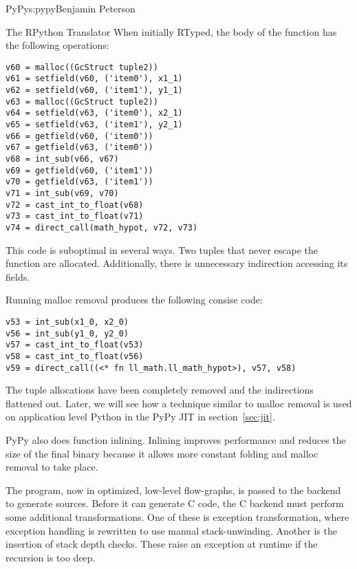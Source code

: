\begin{aosachapter}{PyPy}{s:pypy}{Benjamin Peterson}
\begin{aosasect1}{The RPython Translator}
When initially RTyped, the body of the function has the following operations:
\begin{verbatim}
v60 = malloc((GcStruct tuple2))
v61 = setfield(v60, ('item0'), x1_1)
v62 = setfield(v60, ('item1'), y1_1)
v63 = malloc((GcStruct tuple2))
v64 = setfield(v63, ('item0'), x2_1)
v65 = setfield(v63, ('item1'), y2_1)
v66 = getfield(v60, ('item0'))
v67 = getfield(v63, ('item0'))
v68 = int_sub(v66, v67)
v69 = getfield(v60, ('item1'))
v70 = getfield(v63, ('item1'))
v71 = int_sub(v69, v70)
v72 = cast_int_to_float(v68)
v73 = cast_int_to_float(v71)
v74 = direct_call(math_hypot, v72, v73)
\end{verbatim}
This code is suboptimal in several ways. Two tuples that never escape the
function are allocated. Additionally, there is unnecessary indirection accessing
its fields.

Running malloc removal produces the following consise code:
\begin{verbatim}
v53 = int_sub(x1_0, x2_0)
v56 = int_sub(y1_0, y2_0)
v57 = cast_int_to_float(v53)
v58 = cast_int_to_float(v56)
v59 = direct_call((<* fn ll_math.ll_math_hypot>), v57, v58)
\end{verbatim}
The tuple allocations have been completely removed and the indirections
flattened out. Later, we will see how a technique similar to malloc removal is
used on application level Python in the PyPy JIT in section~\ref{sec:jit}.

PyPy also does function inlining. Inlining improves performance and reduces the
size of the final binary because it allows more constant folding and malloc
removal to take place.

The program, now in optimized, low-level flow-graphs, is passed to the backend
to generate sources. Before it can generate C code, the C backend must perform
some additional transformations. One of these is exception transformation, where
exception handling is rewritten to use manual stack-unwinding. Another is the
insertion of stack depth checks. These raise an exception at runtime if the
recursion is too deep.


\end{aosasect1}
\end{aosachapter}
